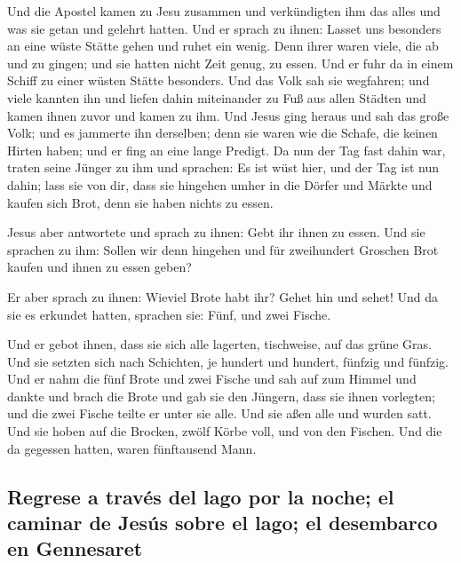  Und die Apostel kamen zu Jesu zusammen und verkündigten
ihm das alles und was sie getan und gelehrt hatten.  Und
er sprach zu ihnen: Lasset uns besonders an eine wüste Stätte gehen und
ruhet ein wenig. Denn ihrer waren viele, die ab und zu gingen; und sie
hatten nicht Zeit genug, zu essen.  Und er fuhr da in
einem Schiff zu einer wüsten Stätte besonders.  Und das
Volk sah sie wegfahren; und viele kannten ihn und liefen dahin
miteinander zu Fuß aus allen Städten und kamen ihnen zuvor und kamen zu
ihm.  Und Jesus ging heraus und sah das große Volk; und
es jammerte ihn derselben; denn sie waren wie die Schafe, die keinen
Hirten haben; und er fing an eine lange Predigt.  Da nun
der Tag fast dahin war, traten seine Jünger zu ihm und sprachen: Es ist
wüst hier, und der Tag ist nun dahin;  lass sie von dir,
dass sie hingehen umher in die Dörfer und Märkte und kaufen sich Brot,
denn sie haben nichts zu essen.

 Jesus aber antwortete und sprach zu ihnen: Gebt ihr
ihnen zu essen. Und sie sprachen zu ihm: Sollen wir denn hingehen und
für zweihundert Groschen Brot kaufen und ihnen zu essen geben?

 Er aber sprach zu ihnen: Wieviel Brote habt ihr? Gehet
hin und sehet! Und da sie es erkundet hatten, sprachen sie: Fünf, und
zwei Fische.

 Und er gebot ihnen, dass sie sich alle lagerten,
tischweise, auf das grüne Gras.  Und sie setzten sich
nach Schichten, je hundert und hundert, fünfzig und fünfzig.
 Und er nahm die fünf Brote und zwei Fische und sah auf
zum Himmel und dankte und brach die Brote und gab sie den Jüngern, dass
sie ihnen vorlegten; und die zwei Fische teilte er unter sie alle.
 Und sie aßen alle und wurden satt.  Und
sie hoben auf die Brocken, zwölf Körbe voll, und von den Fischen.
 Und die da gegessen hatten, waren fünftausend Mann.

\hypertarget{regrese-a-travuxe9s-del-lago-por-la-noche-el-caminar-de-jesuxfas-sobre-el-lago-el-desembarco-en-gennesaret}{%
\subsection{Regrese a través del lago por la noche; el caminar de Jesús
sobre el lago; el desembarco en
Gennesaret}\label{regrese-a-travuxe9s-del-lago-por-la-noche-el-caminar-de-jesuxfas-sobre-el-lago-el-desembarco-en-gennesaret}}

